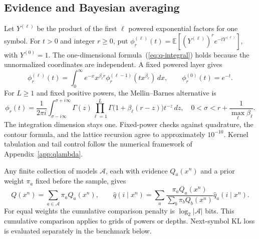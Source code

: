 \documentclass[anon]{alt2027}
\newcommand{\E}{\mathbb{E}}
\renewcommand{\eqref}[1]{(\ref{#1})}
\begin{document}
\subsection{Evidence and Bayesian averaging}
Let $Y^{(\ell)}$ be the product of the first $\ell$ powered exponential factors for one symbol. For $t>0$ and integer $r\ge0$, put $\phi_r^{(\ell)}(t)=\E[(Y^{(\ell)})^r e^{-tY^{(\ell)}}]$, with $Y^{(0)}=1$. The one-dimensional formula~\eqref{eq:q-integral} holds because the unnormalized coordinates are independent. A fixed powered layer gives
\begin{equation}
\phi_r^{(\ell)}(t)=\int_0^\infty e^{-x}x^{\beta_\ell r}
\phi_r^{(\ell-1)}(tx^{\beta_\ell})\,dx,
\qquad \phi_r^{(0)}(t)=e^{-t}.
\label{eq:powered-recursion}
\end{equation}
For $L\ge1$ and fixed positive powers, the Mellin--Barnes alternative is
\begin{equation}
\phi_r(t)=\frac1{2\pi i}\int_{\sigma-i\infty}^{\sigma+i\infty}
\Gamma(z)\prod_{\ell=1}^L\Gamma\bigl(1+\beta_\ell(r-z)\bigr)t^{-z}\,dz,
\quad 0<\sigma<r+\frac1{\max_\ell\beta_\ell}.
\label{eq:powered-mellin}
\end{equation}
The integration dimension stays one. Fixed-power checks against quadrature, the contour formula, and the lattice recursion agree to approximately $10^{-10}$. Kernel tabulation and tail control follow the numerical framework of Appendix~\ref{app:qlambda}.

Any finite collection of models $\mathcal A$, each with evidence $Q_a(x^n)$ and a prior weight $\pi_a$ fixed before the sample, gives
\[
Q(x^n)=\sum_{a\in\mathcal A}\pi_aQ_a(x^n),\qquad
\widehat q(i\mid x^n)=\sum_a\frac{\pi_aQ_a(x^n)}{\sum_b\pi_bQ_b(x^n)}\widehat q_a(i\mid x^n).
\]
For equal weights the cumulative comparison penalty is $\log_2|\mathcal A|$ bits. This cumulative comparison applies to grids of powers or depths. Next-symbol KL loss is evaluated separately in the benchmark below.
\end{document}
